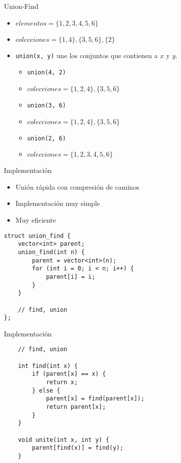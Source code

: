 \documentclass[10pt]{beamer}
\newcommand{\bi}{\begin{itemize}}
\newcommand{\ei}{\end{itemize}}
\begin{document}
\begin{frame}{Union-Find}
    \bi
        \vspace{10pt}
        \item $elementos = \{1,2,3,4,5,6\}$
        \item $colecciones = \{1,4\}, \{3,5,6\}, \{2\}$
        \vspace{10pt}
        \item \texttt{union(x, y)} une los conjuntos que contienen a $x$ y $y$.
        \vspace{10pt}
            \bi
                \item \texttt{union(4, 2)}
                \item $colecciones = \{1,2,4\}, \{3,5,6\}$
                \item \texttt{union(3, 6)}
                \item $colecciones = \{1,2,4\}, \{3,5,6\}$
                \item \texttt{union(2, 6)}
                \item $colecciones = \{1,2,3,4,5,6\}$
            \ei
    \ei
\end{frame}

\begin{frame}[fragile]{Implementación}
    \bi
        \item Unión rápida con compresión de caminos
        \item Implementación muy simple
        \item Muy eficiente
    \ei

    \vspace{10pt}

    \begin{verbatim}
struct union_find {
    vector<int> parent;
    union_find(int n) {
        parent = vector<int>(n);
        for (int i = 0; i < n; i++) {
            parent[i] = i;
        }
    }

    // find, union
};
    \end{verbatim}
\end{frame}

\begin{frame}[fragile]{Implementación}

    \begin{verbatim}
    // find, union

    int find(int x) {
        if (parent[x] == x) {
            return x;
        } else {
            parent[x] = find(parent[x]);
            return parent[x];
        }
    }

    void unite(int x, int y) {
        parent[find(x)] = find(y);
    }
    \end{verbatim}
\end{frame}
\end{document}

